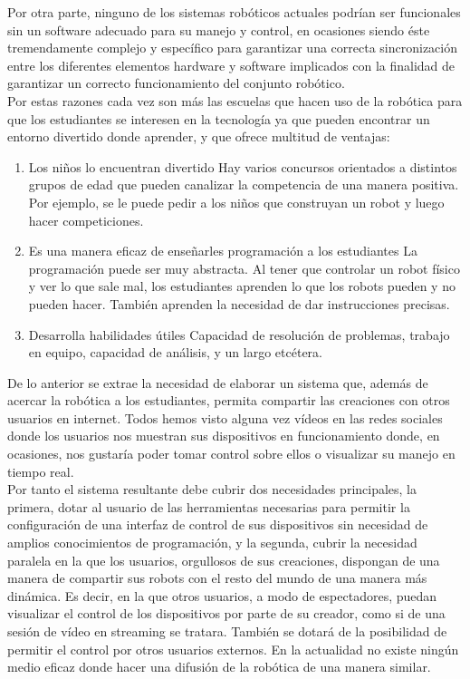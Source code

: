 Por otra parte, ninguno de los sistemas robóticos actuales podrían ser funcionales sin un software adecuado para su manejo y control, en ocasiones siendo éste tremendamente complejo y específico para garantizar
una correcta sincronización entre los diferentes elementos hardware y software implicados con la finalidad de garantizar un correcto funcionamiento del conjunto robótico.\\

Por estas razones cada vez son más las escuelas que hacen uso de la robótica para que los estudiantes se interesen en la tecnología ya que pueden encontrar un entorno divertido donde aprender,
y que ofrece multitud de ventajas: 

\begin{enumerate}
\item {Los niños lo encuentran divertido}
Hay varios concursos orientados a distintos grupos de edad que pueden canalizar la competencia de una manera positiva. Por ejemplo, se le puede pedir a los niños que construyan un robot y luego hacer competiciones.\\
\item{Es una manera eficaz de enseñarles programación a los estudiantes}
La programación puede ser muy abstracta. Al tener que controlar un robot físico y ver lo que sale mal, los estudiantes aprenden lo que los robots pueden y no pueden hacer. 
También aprenden la necesidad de dar instrucciones precisas.\\
\item{ Desarrolla habilidades útiles}
Capacidad de resolución de problemas, trabajo en equipo, capacidad de análisis, y un largo etcétera.
\end{enumerate}


De lo anterior se extrae la necesidad de elaborar un sistema que, además de acercar la robótica a los estudiantes, permita compartir las creaciones con otros usuarios en internet. Todos hemos visto alguna vez vídeos en las redes sociales donde los usuarios nos muestran sus dispositivos en funcionamiento donde, en ocasiones, nos gustaría poder tomar control sobre ellos o visualizar su manejo en tiempo real.\\

Por tanto el sistema resultante debe cubrir dos necesidades principales, la primera, dotar al usuario de las herramientas necesarias para permitir la configuración de una interfaz de control de sus dispositivos sin necesidad de amplios conocimientos de programación, y la segunda, cubrir la necesidad paralela en la que los usuarios, orgullosos de sus creaciones, dispongan de una manera de compartir sus robots con el resto del mundo de una manera más dinámica. Es decir, en la que otros usuarios, a modo de espectadores, puedan visualizar el control de los dispositivos por parte de su creador, como si de una sesión de vídeo en streaming se tratara. También se dotará de la posibilidad de permitir el control por otros usuarios externos. En la actualidad no existe ningún medio eficaz donde hacer una difusión de la robótica de una manera similar.\\

